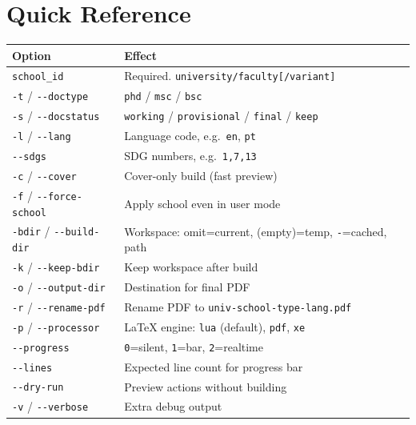 \section{Quick Reference}
\label{sec:buildpy_quickref}

\begin{center}
\renewcommand{\arraystretch}{1.3}
\begin{tabular}{lp{8.5cm}}
  \hline
  \textbf{Option} & \textbf{Effect} \\
  \hline
  \verb!school_id!               & Required. \texttt{university/faculty[/variant]} \\
  \verb!-t! / \verb!--doctype!   & \texttt{phd} / \texttt{msc} / \texttt{bsc} \\
  \verb!-s! / \verb!--docstatus! & \texttt{working} / \texttt{provisional} / \texttt{final} / \texttt{keep} \\
  \verb!-l! / \verb!--lang!      & Language code, e.g.\ \texttt{en}, \texttt{pt} \\
  \verb!--sdgs!                  & SDG numbers, e.g.\ \texttt{1,7,13} \\
  \verb!-c! / \verb!--cover!     & Cover-only build (fast preview) \\
  \verb!-f! / \verb!--force-school! & Apply school even in user mode \\
  \verb!-bdir! / \verb!--build-dir! & Workspace: omit=current, (empty)=temp, \texttt{-}=cached, path \\
  \verb!-k! / \verb!--keep-bdir! & Keep workspace after build \\
  \verb!-o! / \verb!--output-dir! & Destination for final PDF \\
  \verb!-r! / \verb!--rename-pdf! & Rename PDF to \texttt{univ-school-type-lang.pdf} \\
  \verb!-p! / \verb!--processor! & LaTeX engine: \texttt{lua} (default), \texttt{pdf}, \texttt{xe} \\
  \verb!--progress!              & \texttt{0}=silent, \texttt{1}=bar, \texttt{2}=realtime \\
  \verb!--lines!                 & Expected line count for progress bar \\
  \verb!--dry-run!               & Preview actions without building \\
  \verb!-v! / \verb!--verbose!   & Extra debug output \\
  \hline
\end{tabular}
\end{center}
